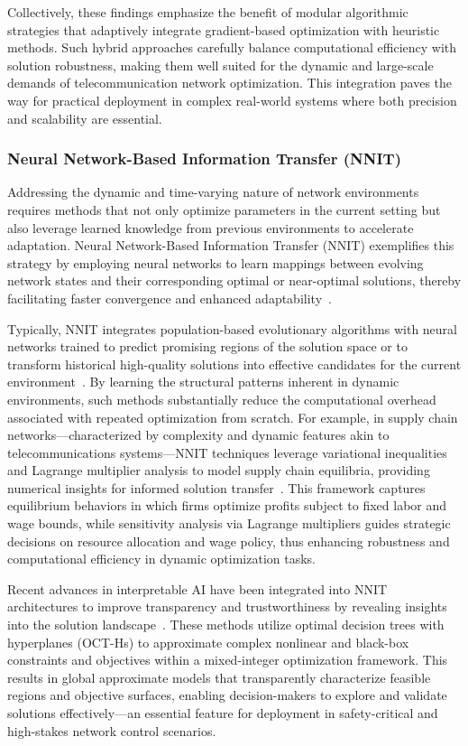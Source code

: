 \documentclass[sigconf]{acmart}
\begin{document}
Collectively, these findings emphasize the benefit of modular algorithmic strategies that adaptively integrate gradient-based optimization with heuristic methods. Such hybrid approaches carefully balance computational efficiency with solution robustness, making them well suited for the dynamic and large-scale demands of telecommunication network optimization. This integration paves the way for practical deployment in complex real-world systems where both precision and scalability are essential.

\subsubsection{Neural Network-Based Information Transfer (NNIT)}

Addressing the dynamic and time-varying nature of network environments requires methods that not only optimize parameters in the current setting but also leverage learned knowledge from previous environments to accelerate adaptation. Neural Network-Based Information Transfer (NNIT) exemplifies this strategy by employing neural networks to learn mappings between evolving network states and their corresponding optimal or near-optimal solutions, thereby facilitating faster convergence and enhanced adaptability~\cite{ref38,ref39,ref40,ref47}.

Typically, NNIT integrates population-based evolutionary algorithms with neural networks trained to predict promising regions of the solution space or to transform historical high-quality solutions into effective candidates for the current environment~\cite{ref47}. By learning the structural patterns inherent in dynamic environments, such methods substantially reduce the computational overhead associated with repeated optimization from scratch. For example, in supply chain networks—characterized by complexity and dynamic features akin to telecommunications systems—NNIT techniques leverage variational inequalities and Lagrange multiplier analysis to model supply chain equilibria, providing numerical insights for informed solution transfer~\cite{ref38}. This framework captures equilibrium behaviors in which firms optimize profits subject to fixed labor and wage bounds, while sensitivity analysis via Lagrange multipliers guides strategic decisions on resource allocation and wage policy, thus enhancing robustness and computational efficiency in dynamic optimization tasks.

Recent advances in interpretable AI have been integrated into NNIT architectures to improve transparency and trustworthiness by revealing insights into the solution landscape~\cite{ref39}. These methods utilize optimal decision trees with hyperplanes (OCT-Hs) to approximate complex nonlinear and black-box constraints and objectives within a mixed-integer optimization framework. This results in global approximate models that transparently characterize feasible regions and objective surfaces, enabling decision-makers to explore and validate solutions effectively—an essential feature for deployment in safety-critical and high-stakes network control scenarios.
\end{document}
